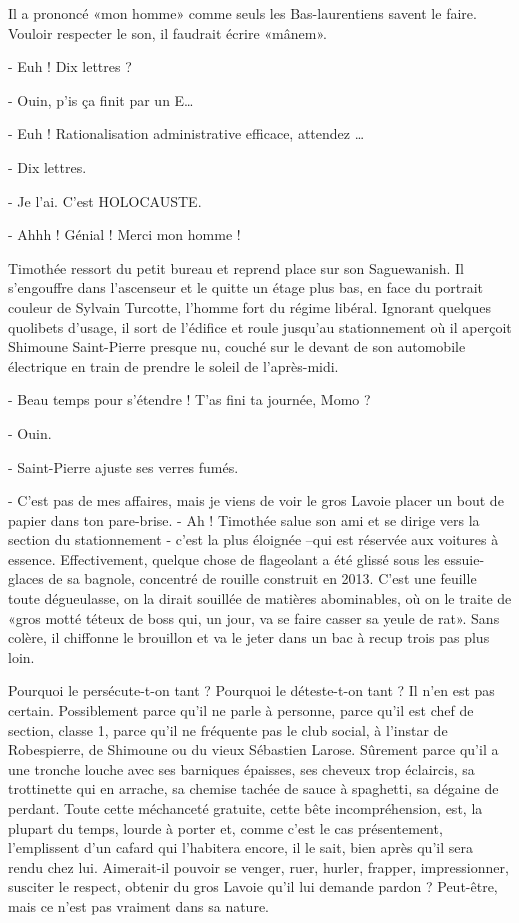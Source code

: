 Il a prononcé «mon homme» comme seuls les Bas-laurentiens savent le faire. Vouloir respecter le son, il faudrait écrire «mânem».

- Euh ! Dix lettres ?

- Ouin, p’is ça finit par un E…

- Euh ! Rationalisation administrative efficace, attendez …

- Dix lettres.

- Je l’ai. C’est HOLOCAUSTE.

- Ahhh ! Génial ! Merci mon homme !

Timothée ressort du petit bureau et reprend place sur son Saguewanish. Il s’engouffre dans l’ascenseur et le quitte un étage plus bas, en face du portrait couleur de Sylvain Turcotte, l’homme fort du régime libéral. Ignorant quelques quolibets d’usage, il sort de l’édifice et roule jusqu’au stationnement où il aperçoit Shimoune Saint-Pierre presque nu, couché sur le devant de son automobile électrique en train de prendre le soleil de l’après-midi.

- Beau temps pour s’étendre ! T’as fini ta journée, Momo ?

- Ouin.

- Saint-Pierre ajuste ses verres fumés.

- C’est pas de mes affaires, mais je viens de voir le gros Lavoie placer un bout de papier dans ton pare-brise.
- Ah !
Timothée salue son ami et se dirige vers la section du stationnement - c’est la plus éloignée –qui est réservée aux voitures à essence. Effectivement, quelque chose de flageolant a été glissé sous les essuie-glaces de sa bagnole, concentré de rouille construit en 2013. C’est une feuille toute dégueulasse, on la dirait souillée de matières abominables, où on le traite de «gros motté téteux de boss qui, un jour, va se faire casser sa yeule de rat». Sans colère, il chiffonne le brouillon et va le jeter dans un bac à recup trois pas plus loin.

Pourquoi le persécute-t-on tant ? Pourquoi le déteste-t-on tant ? Il n’en est pas certain. Possiblement parce qu’il ne parle à personne, parce qu’il est chef de section, classe 1, parce qu’il ne fréquente pas le club social, à l’instar de Robespierre, de Shimoune ou du vieux Sébastien Larose. Sûrement parce qu’il a une tronche louche avec ses barniques épaisses, ses cheveux trop éclaircis, sa trottinette qui en arrache, sa chemise tachée de sauce à spaghetti, sa dégaine de perdant. Toute cette méchanceté gratuite, cette bête incompréhension, est, la plupart du temps, lourde à porter et, comme c’est le cas présentement, l’emplissent d’un cafard qui l’habitera encore, il le sait, bien après qu’il sera rendu chez lui. Aimerait-il pouvoir se venger, ruer, hurler, frapper, impressionner, susciter le respect, obtenir du gros Lavoie qu’il lui demande pardon ? Peut-être, mais ce n’est pas vraiment dans sa nature.

